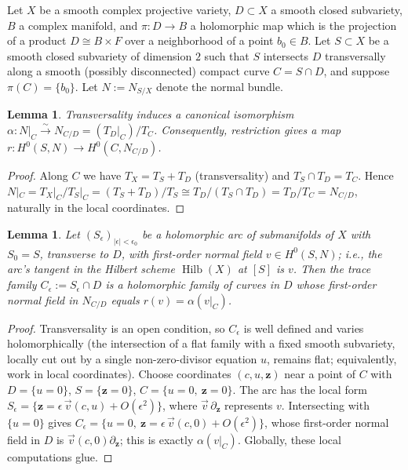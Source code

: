 \documentclass[11pt]{amsart}
\DeclareMathOperator{\Hilb}{Hilb}
\theoremstyle{plain}
\newtheorem{lemma}[theorem]{Lemma}
\theoremstyle{definition}
\theoremstyle{remark}
\begin{document}
\begin{setup}\label{setup:abstract}
Let $X$ be a smooth complex projective variety, $D\subset X$ a smooth closed
subvariety, $B$ a complex manifold, and $\pi:D\to B$ a holomorphic map which is the
projection of a product $D\cong B\times F$ over a neighborhood of a point $b_0\in B$.
Let $S\subset X$ be a smooth closed subvariety of dimension $2$ such that $S$
intersects $D$ transversally along a smooth (possibly disconnected) compact curve
$C=S\cap D$, and suppose $\pi(C)=\{b_0\}$. Let $N:=N_{S/X}$ denote the normal bundle.
\end{setup}

\begin{lemma}\label{lem:iso}
Transversality induces a canonical isomorphism $\alpha:N|_C\stackrel{\sim}{\longrightarrow}
N_{C/D}=(T_D|_C)/T_C$. Consequently, restriction gives a map
$r:H^0(S,N)\to H^0(C,N_{C/D})$.
\end{lemma}

\begin{proof}
Along $C$ we have $T_X=T_S+T_D$ (transversality) and $T_S\cap T_D=T_C$. Hence
$N|_C=T_X|_C/T_S|_C=(T_S+T_D)/T_S\cong T_D/(T_S\cap T_D)=T_D/T_C=N_{C/D}$, naturally
in the local coordinates.
\end{proof}

\begin{lemma}\label{lem:motion}
Let $(S_\epsilon)_{|\epsilon|<\epsilon_0}$ be a holomorphic arc of submanifolds of $X$
with $S_0=S$, transverse to $D$, with first-order normal field
$v\in H^0(S,N)$; i.e., the arc's tangent in the Hilbert scheme $\Hilb(X)$ at $[S]$
is $v$. Then the trace family $C_\epsilon:=S_\epsilon\cap D$ is a holomorphic family
of curves in $D$ whose first-order normal field in $N_{C/D}$ equals
$r(v)=\alpha(v|_C)$.
\end{lemma}

\begin{proof}
Transversality is an open condition, so $C_\epsilon$ is well defined and varies
holomorphically (the intersection of a flat family with a fixed smooth subvariety,
locally cut out by a single non-zero-divisor equation $u$, remains flat;
equivalently, work in local coordinates). Choose coordinates
$(c,u,\mathbf z)$ near a point of $C$ with $D=\{u=0\}$, $S=\{\mathbf z=0\}$,
$C=\{u=0,\ \mathbf z=0\}$. The arc has the local form
$S_\epsilon=\{\mathbf z=\epsilon\,\vec v(c,u)+O(\epsilon^2)\}$, where
$\vec v\,\partial_{\mathbf z}$ represents $v$. Intersecting with $\{u=0\}$ gives
$C_\epsilon=\{u=0,\ \mathbf z=\epsilon\,\vec v(c,0)+O(\epsilon^2)\}$, whose
first-order normal field in $D$ is $\vec v(c,0)\partial_{\mathbf z}$; this is exactly
$\alpha(v|_C)$. Globally, these local computations glue.
\end{proof}
\end{document}
